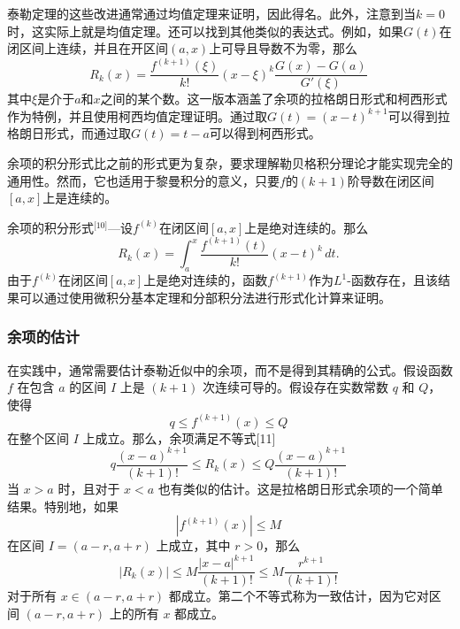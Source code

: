 泰勒定理的这些改进通常通过均值定理来证明，因此得名。此外，注意到当\( k = 0 \) 时，这实际上就是均值定理。还可以找到其他类似的表达式。例如，如果\( G(t) \)在闭区间上连续，并且在开区间\( (a, x) \)上可导且导数不为零，那么
\[
R_k(x) = \frac{f^{(k+1)}(\xi)}{k!}(x - \xi)^k \frac{G(x) - G(a)}{G'(\xi)}~
\]
其中\( \xi \)是介于\( a \)和\( x \)之间的某个数。这一版本涵盖了余项的拉格朗日形式和柯西形式作为特例，并且使用柯西均值定理证明。通过取\( G(t) = (x - t)^{k+1} \)可以得到拉格朗日形式，而通过取\( G(t) = t - a \)可以得到柯西形式。

余项的积分形式比之前的形式更为复杂，要求理解勒贝格积分理论才能实现完全的通用性。然而，它也适用于黎曼积分的意义，只要\( f \)的\( (k+1) \)阶导数在闭区间\( [a, x] \)上是连续的。

余项的积分形式\(^\text{[10]}\)—设\( f^{(k)} \)在闭区间\( [a, x] \)上是绝对连续的。那么
\[
R_k(x) = \int_a^x \frac{f^{(k+1)}(t)}{k!} (x - t)^k \, dt.~
\]
由于\( f^{(k)} \)在闭区间\( [a, x] \)上是绝对连续的，函数\( f^{(k+1)} \)作为\( L^1 \)-函数存在，且该结果可以通过使用微积分基本定理和分部积分法进行形式化计算来证明。
\subsubsection{余项的估计}  
在实践中，通常需要估计泰勒近似中的余项，而不是得到其精确的公式。假设函数 \( f \) 在包含 \( a \) 的区间 \( I \) 上是 \( (k + 1) \) 次连续可导的。假设存在实数常数 \( q \) 和 \( Q \)，使得
\[
q \leq f^{(k+1)}(x) \leq Q~
\]
在整个区间 \( I \) 上成立。那么，余项满足不等式[11]
\[
q \frac{(x - a)^{k+1}}{(k + 1)!} \leq R_k(x) \leq Q \frac{(x - a)^{k+1}}{(k + 1)!}~
\]
当 \( x > a \) 时，且对于 \( x < a \) 也有类似的估计。这是拉格朗日形式余项的一个简单结果。特别地，如果
\[
|f^{(k+1)}(x)| \leq M~
\]
在区间 \( I = (a - r, a + r) \) 上成立，其中 \( r > 0 \)，那么
\[
|R_k(x)| \leq M \frac{|x - a|^{k+1}}{(k+1)!} \leq M \frac{r^{k+1}}{(k+1)!}~
\]
对于所有 \( x \in (a - r, a + r) \) 都成立。第二个不等式称为一致估计，因为它对区间 \( (a - r, a + r) \) 上的所有 \( x \) 都成立。
